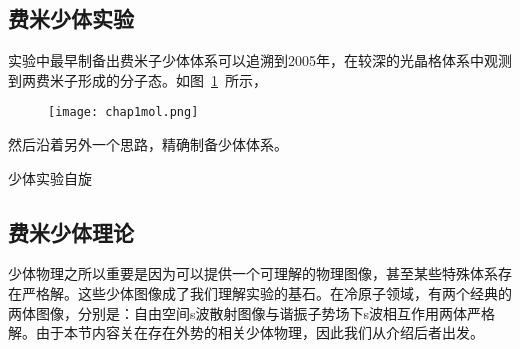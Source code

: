 \begin{comment}
\begin{figure}[!htbp]
    \centering
    \texttt{[image: chap1tgrho.png]}
    \bicaption{摘自1D tg rho}{Reprinted from 1D tg rho}
    \label{chap1tgrho}
\end{figure}
不仅限于强相互作用极限，在趋向于这个极限的过程，利用严格解的办法{\color{red}Deuretzbacher F给出了少体体系费米化的过程}。
\begin{figure}[!htbp]
    \centering
    \texttt{[image: chap1tgn.png]}
    \bicaption{摘自1D tg n}{Reprinted from 1D tg n}
    \label{chap1tgn}
\end{figure}
最终T-G气体在实验中被观测到。
\end{comment}

\subsection{费米少体实验}
实验中最早制备出费米子少体体系可以追溯到2005年，在较深的光晶格体系中观测到两费米子形成的分子态\cite{greiner2002quantum,EsslingerFermiSea,Esslinger1DMol,Esslinger3DMol,Ospelkaus3DMol,Hecker3DMol,SalaCIRMol}。如图~\ref{chap1mol}~所示，
\begin{figure}[!htbp]
    \centering
    \texttt{[image: chap1mol.png]}
    \label{chap1mol}
\end{figure}

然后沿着另外一个思路，精确制备少体体系\cite{SerwaneDeterministic,WenzFermiSeaOnebyOne,zurn2012fermionization,Zurn2013Pairing,MurmannSpinChain,MurmannTwoFermionDoubleWell,RontaniTunneling}。

少体实验自旋\cite{pagano2014one}


\subsection{费米少体理论}

少体物理之所以重要是因为可以提供一个可理解的物理图像，甚至某些特殊体系存在严格解。这些少体图像成了我们理解实验的基石。在冷原子领域，有两个经典的两体图像，分别是：自由空间s波散射图像与谐振子势场下s波相互作用两体严格解。由于本节内容关在存在外势的相关少体物理，因此我们从介绍后者出发。

